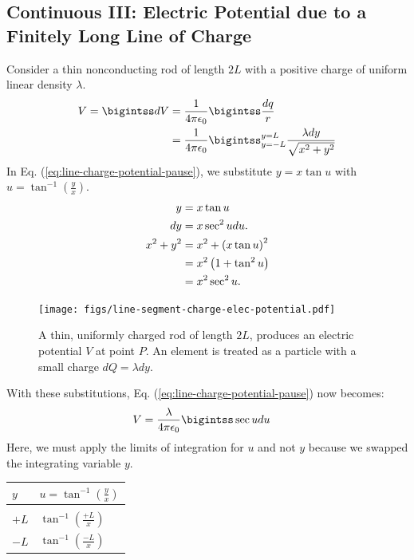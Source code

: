 \documentclass[12pt,b4paper]{article}
\begin{document}
\subsection{Continuous III: Electric Potential due to a Finitely Long Line of Charge}

Consider a thin nonconducting rod of length $2L$ with a positive charge of uniform linear density $\lambda$.
\begin{align}
    V=\bigintss dV&=\frac{1}{4\pi\epsilon_0}\bigintss\frac{dq}{r}\notag\\
    &=\frac{1}{4\pi\epsilon_0}\bigintss_{y=-L}^{y=L}\frac{\lambda dy}{\sqrt{x^2+y^2}}\label{eq:line-charge-potential-pause}
\end{align}
In Eq. (\ref{eq:line-charge-potential-pause}), we substitute $y=x\tan{u}$ with $\displaystyle u=\tan^{-1}\left(\frac{y}{x}\right)$.
\begin{align*}
    y&=x\tan{u}\\
    dy&=x\sec^2{u}du.\\
    x^2+y^2&=x^2+\left(x\tan{u}\right)^2\\
    &=x^2\left(1+\tan^2{u}\right)\notag\\
    &=x^2\sec^2{u}.
\end{align*}
\begin{figure}[H]
    \centering
    \texttt{[image: figs/line-segment-charge-elec-potential.pdf]}
    \caption{A thin, uniformly charged rod of length $2L$, produces an electric potential $V$ at point $P$. An element is treated as a particle with a small charge $dQ=\lambda dy$.}
    \label{fig:line-segment-charge-elec-potential}
\end{figure}
With these substitutions, Eq. (\ref{eq:line-charge-potential-pause}) now becomes:
\begin{align}
    V&=\frac{\lambda}{4\pi\epsilon_0}\bigintss\sec{u}du\notag
\end{align}
Here, we must apply the limits of integration for $u$ and not $y$ because we swapped the integrating variable $y$.
\begin{table}[H]
    \centering
    \begin{tabular}{P{1.0cm}|P{3.0cm}}
    $y$ & $\displaystyle u=\tan^{-1}\left(\frac{y}{x}\right)$ \\[8pt]\hline\hline\\
    $+L$ & $\displaystyle\tan^{-1}\left(\frac{+L}{x}\right)$\\[12pt]
    $-L$ & $\displaystyle\tan^{-1}\left(\frac{-L}{x}\right)$\\
\end{tabular}
\end{table}
\end{document}
